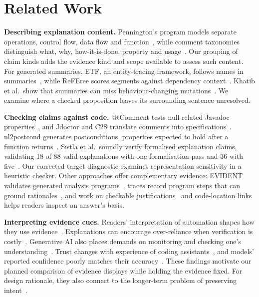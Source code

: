 \section{Related Work}
\noindent\textbf{Describing explanation content.} Pennington's program models separate operations, control flow, data flow and function~\cite{pennington1987}, while comment taxonomies distinguish what, why, how-it-is-done, property and usage~\cite{chen2021commentcategory}. Our grouping of claim kinds adds the evidence kind and scope available to assess such content. For generated summaries, ETF, an entity-tracing framework, follows names in summaries~\cite{etf2025}, while ReFEree scores segments against dependency context~\cite{referee2026}. Khatib et al.\ show that summaries can miss behaviour-changing mutations~\cite{khatib2026mutation}. We examine where a checked proposition leaves its surrounding sentence unresolved.

\noindent\textbf{Checking claims against code.} @tComment tests null-related Javadoc properties~\cite{tan2012tcomment}, and Jdoctor and C2S translate comments into specifications~\cite{blasi2018jdoctor,zhai2020c2s}. nl2postcond generates postconditions, properties expected to hold after a function returns~\cite{endres2024nl2postcond}. Sistla et al.\ soundly verify formalised explanation claims, validating 18 of 88 valid explanations with one formalisation pass and 36 with five~\cite{sistla2025verified}. Our corrected-target diagnostic examines representation sensitivity in a heuristic checker. Other approaches offer complementary evidence: EVIDENT validates generated analysis programs~\cite{evident2026}, traces record program steps that can ground rationales~\cite{thakur2025verifiablecot}, and work on checkable justifications~\cite{xu2025justifications} and code-location links~\cite{arafat2025citation} helps readers inspect an answer's basis.

\noindent\textbf{Interpreting evidence cues.} Readers' interpretation of automation shapes how they use evidence~\cite{lee2004trust}. Explanations can encourage over-reliance when verification is costly~\cite{vasconcelos2023explanations}. Generative AI also places demands on monitoring and checking one's understanding~\cite{tankelevitch2024metacognitive}. Trust changes with experience of coding assistants~\cite{trustdynamics2025}, and models' reported confidence poorly matches their accuracy~\cite{spiess2025calibration}. These findings motivate our planned comparison of evidence displays while holding the evidence fixed. For design rationale, they also connect to the longer-term problem of preserving intent~\cite{storey2026intentdebt}.
